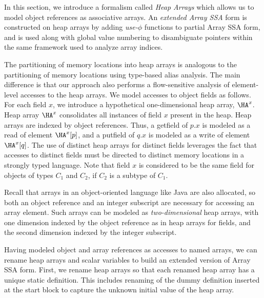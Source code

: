 In this section,
we introduce a
formalism called {\em Heap Arrays} which allows us to model
object references as associative arrays.   
An {\em extended Array SSA} form is constructed on heap arrays by
adding
{\em use-$\phi$} functions to partial Array SSA form, and is used
along with global value numbering to
disambiguate pointers within the same framework used to analyze
array indices.

The partitioning of memory locations into
heap arrays is analogous to the partitioning of memory locations using
type-based alias analysis.  The main difference is that
our approach also performs a flow-sensitive analysis of
element-level accesses to the heap arrays.
We model accesses to object fields as follows.
For each field $x$, we introduce
a hypothetical one-dimensional
heap array,  $\HA^x$.
Heap array $\HA^x$ consolidates all instances of field
$x$ present in the heap.
Heap arrays are indexed by object references.
Thus, a {\sc getfield}
of $p.x$ is modeled as a read of element $\HA^x[p]$,
and a {\sc putfield} of $q.x$ is modeled as a write of element $\HA^x[q]$.
The use of distinct heap arrays for distinct fields leverages the 
fact that accesses to distinct fields must be directed to 
distinct memory locations in a strongly typed language.
Note that field $x$ is considered to be the same field for objects of types
$C_1$ and $C_2$, if $C_2$ is
a subtype of $C_1$.

Recall that 
arrays in an object-oriented language like Java
are also allocated, so both an object reference and an
integer subscript are necessary for accessing an array element. 
Such arrays can be modeled as {\it two-dimensional} heap
arrays, with one dimension indexed by
the object reference as in heap arrays for fields, and the second
dimension indexed by the integer subscript. 

Having modeled object and array references as accesses to
named arrays, we can rename heap arrays and scalar variables
to build an extended version of Array SSA form.
First, we rename heap arrays so
that each renamed heap array
has a unique static definition.
This includes renaming of the dummy definition 
inserted at the start block to capture the unknown initial value
of the heap array.

